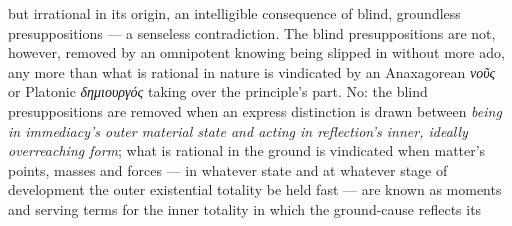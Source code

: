 \documentclass[12pt,a4paper]{book}
\begin{document}
\setcounter{footnote}{0}
but irrational in its origin, an intelligible consequence of blind, groundless
presuppositions --- a senseless contradiction. The blind presuppositions are
not, however, removed by an omnipotent knowing being slipped in without more
ado, any more than what is rational in nature is vindicated by an Anaxagorean
\textit{νοῦς} or Platonic \textit{δημιουργός} taking over the principle's part.
No: the blind presuppositions are removed when an express distinction is drawn
between \emph{being in immediacy's outer material state and acting in
reflection's inner, ideally overreaching form}; what is rational in the ground
is vindicated when matter's points, masses and forces --- in whatever state and
at whatever stage of development the outer existential totality be held fast
--- are known as moments and serving terms for the inner totality in which the
ground-cause reflects its
\end{document}
